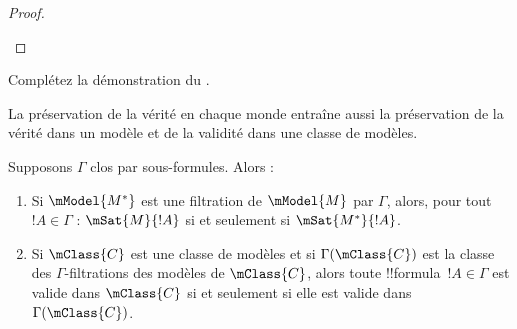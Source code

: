 \documentclass[../../../include/open-logic-section]{subfiles}
\begin{document}
\begin{proof}
\begin{enumerate}
  \end{enumerate}
\end{proof}

\begin{prob}
  Complétez la démonstration du .
\end{prob}

La préservation de la vérité en chaque monde entraîne aussi la
préservation de la vérité dans un modèle et de la validité dans une
classe de modèles.

\begin{cor}
  Supposons $\Gamma$ clos par sous-formules. Alors :
  \begin{enumerate}
  \item Si $\mModel{M^*}$ est une filtration de $\mModel{M}$ par
    $\Gamma$, alors, pour tout $!A \in \Gamma$ :
    $\mSat{M}{!A}$ si et seulement si $\mSat{M^*}{!A}$.
  \item Si $\mClass{C}$ est une classe de modèles et si
    $\Gamma(\mClass{C})$ est la classe des $\Gamma$-filtrations des
    modèles de $\mClass{C}$, alors toute !!{formula}~$!A \in \Gamma$
    est valide dans $\mClass{C}$ si et seulement si elle est valide
    dans $\Gamma(\mClass{C})$.
  \end{enumerate}
\end{cor}
\end{document}
